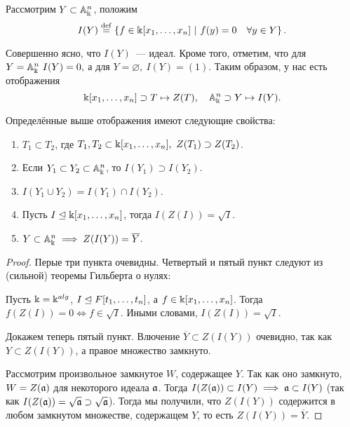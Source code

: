	\begin{definition} 
		Рассмотрим $Y \subset \mathbb{A}_{\Bbbk}^n$, положим 
	\[
		I(Y) \stackrel{\mathrm{def}}{=} \left\{ f \in \Bbbk[x_1, \ldots, x_n] \ \vert \ f(y) = 0 \quad \forall y \in Y \right\}.
	\]	
	\end{definition}
		

	Совершенно ясно, что $I(Y)$~--- идеал. Кроме того, отметим, что для $Y = \mathbb{A}_{\Bbbk}^n \ I(Y) = 0,$ а для $Y = \varnothing, \ I(Y) = (1)$. Таким образом, у нас есть отображения 
	\[
		\Bbbk[x_1, \ldots, x_n] \supset T \mapsto Z(T), \quad \mathbb{A}_{\Bbbk}^n \supset Y \mapsto I(Y).
	\]

	\begin{statement}\label{ag_prop_1} \hypertarget{bilet_2}{}
		Определённые выше отображения имеют следующие свойства: 
		\begin{enumerate}
		\item $T_1 \subset T_2$, где $T_1, T_2 \subset \bk[x_1, \ldots, x_n], \ Z(T_1) \supset Z(T_2)$.

		\item Если $Y_1 \subset Y_2 \subset \mathbb{A}_{\Bbbk}^n$, то $I(Y_1) \supset I(Y_2)$.

		\item $I(Y_1 \cup Y_2) = I(Y_1) \cap I(Y_2)$.

		\item Пусть $I \trianglelefteq \Bbbk[x_1, \ldots, x_n]$, тогда $I(Z(I)) = \sqrt{I}$.

		\item $Y \subset \mathbb{A}_{\Bbbk}^n \implies Z(I(Y)) = \overline{Y}$.

	\end{enumerate}		
	\end{statement}	
	\begin{proof}
		Перые три пункта очевидны. Четвертый и пятый пункт следуют из (сильной) теоремы Гильберта о нулях: 

		\begin{theorem}
			Пусть $\Bbbk = \Bbbk^{alg}$, $I \trianglelefteq F[t_{1}, \ldots, t_{n}]$, а $f \in \Bbbk[x_{1}, \ldots, x_{n}]$. Тогда 
			$f(Z(I)) = 0 \Leftrightarrow f \in \sqrt{I}$. Иными словами, $I(Z(I)) = \sqrt{I}$.
		\end{theorem}

		Докажем теперь пятый пункт. Влючение $\overline{Y} \subset Z(I(Y))$ очевидно, так как 
		$Y \subset Z(I(Y))$, а правое множество замкнуто. 

		Рассмотрим произвольное замкнутое $W$, содержащее $Y$. Так как оно замкнуто, $W = Z(\mathfrak{a})$ для некоторого идеала $\mathfrak{a}$.  Тогда $I(Z(\mathfrak{a})) \subset I(Y) \implies \mathfrak{a} \subset I(Y)$ (так как $I(Z(\mathfrak{a})) = \sqrt{\mathfrak{a}} \supset \sqrt{\mathfrak{a}}$). Тогда мы получили, что $Z(I(Y))$ содержится в любом замкнутом множестве, содержащем $Y$, то есть $Z(I(Y)) = \overline{Y}$.
	\end{proof}

